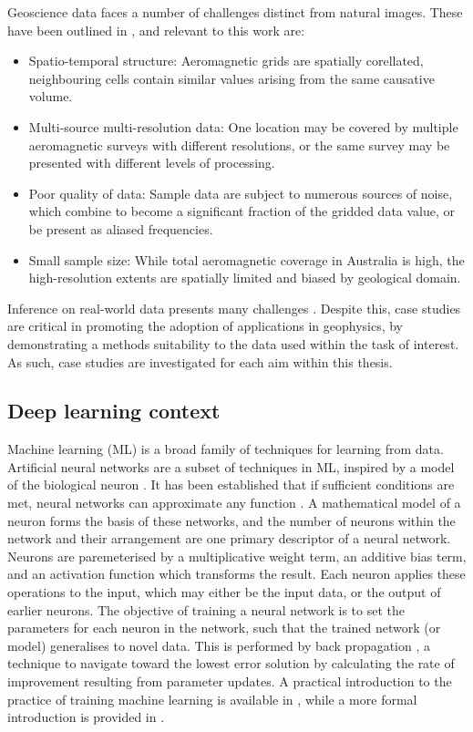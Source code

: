 Geoscience data faces a number of challenges distinct from natural images. These have been outlined in \textcite{karpatneMachineLearningGeosciences2019}, and relevant to this work are:
\begin{itemize}
    \item{} Spatio-temporal structure: Aeromagnetic grids are spatially corellated, neighbouring cells contain similar values arising from the same causative volume.
    \item{} Multi-source multi-resolution data: One location may be covered by multiple aeromagnetic surveys with different resolutions, or the same survey may be presented with different levels of processing.
    \item{} Poor quality of data: Sample data are subject to numerous sources of noise, which combine to become a significant fraction of the gridded data value, or be present as aliased frequencies.
    \item{} Small sample size: While total aeromagnetic coverage in Australia is high, the high-resolution extents are spatially limited and biased by geological domain.
\end{itemize}

Inference on real-world data presents many challenges \parencite{nikolenkoSyntheticDataDeep2021,tremblayTrainingDeepNetworks2018}.
Despite this, case studies are critical in promoting the adoption of applications in geophysics, by demonstrating a methods suitability to the data used within the task of interest.
As such, case studies are investigated for each aim within this thesis.

\subsection{Deep learning context}
Machine learning (ML) is a broad family of techniques for learning from data.
Artificial neural networks are a subset of techniques in ML, inspired by a model of the biological neuron \parencite{bishopNeuralNetworksPattern1995}.
It has been established that if sufficient conditions are met, neural networks can approximate any function \parencite{hornikMultilayerFeedforwardNetworks1989}.
A mathematical model of a neuron forms the basis of these networks, and the number of neurons within the network and their arrangement are one primary descriptor of a neural network.
Neurons are paremeterised by a multiplicative weight term, an additive bias term, and an activation function which transforms the result.
Each neuron applies these operations to the input, which may either be the input data, or the output of earlier neurons.
The objective of training a neural network is to set the parameters for each neuron in the network, such that the trained network (or model) generalises to novel data.
This is performed by back propagation \parencite{rumelhartLearningRepresentationsBackpropagating1988}, a technique to navigate toward the lowest error solution by calculating the rate of improvement resulting from parameter updates.
A practical introduction to the practice of training machine learning is available in \textcite{stevensDeepLearningPyTorch2020}, while a more formal introduction is provided in \textcite{bishopPatternRecognitionMachine2006}.

